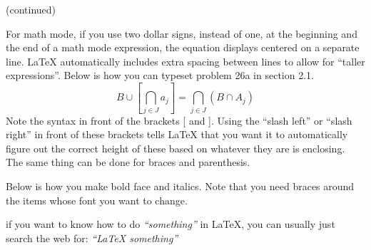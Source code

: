 \documentclass[12pt]{article}
\begin{document}
\vfill %

\begin{center} (continued) \end{center}


\newpage %

For math mode, if you use two dollar signs, instead of one, at the beginning and the
end of a math mode expression, the equation displays centered on a
separate line.  LaTeX automatically includes extra spacing between
lines to allow for ``taller expressions''.  Below is how you can
typeset problem 26a in section 2.1. 
$$ B \cup \left[ \bigcap_{j \in J}  a_j \right] = \bigcap_{j \in J} \left( B \cap A_j \right) $$
Note the syntax in front of the brackets [ and ]. Using the ``slash left'' 
or ``slash right'' in front of these brackets tells LaTeX that you want 
it to automatically figure out the correct
height of these based on whatever they are is enclosing.
The same thing can be done for braces and parenthesis.

\bigskip

Below is how you make bold face and italics. Note that you need
braces around the items whose font you want to change.

\bigskip

 if you want to know how to do {\it ``something''} in LaTeX, you can usually just search the web for: {\it ``LaTeX something''}


\end{document}
